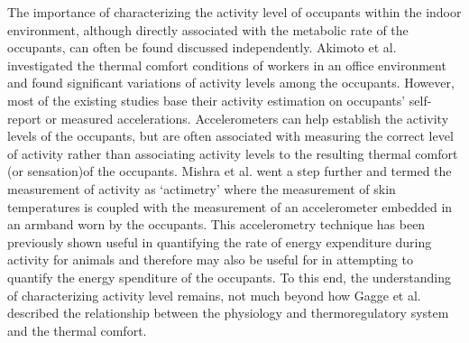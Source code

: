 	The importance of characterizing the activity level of occupants within the indoor environment, although directly associated with the metabolic rate of the occupants, can often be found discussed independently. Akimoto et al. investigated the thermal comfort conditions of workers in an office environment and found significant variations of activity levels among the occupants\cite{akimoto_thermal_2010}. However, most of the existing studies base their activity estimation on occupants' self-report \cite{huang_potential_2015} or measured accelerations. Accelerometers can help establish the activity levels of the occupants\cite{rothney_validity_2008}, but are often associated with measuring the correct level of activity rather than associating activity levels to the resulting thermal comfort (or sensation)of the occupants. Mishra et al. went a step further and termed the measurement of activity as `actimetry' where the measurement of skin temperatures is coupled with the measurement of an accelerometer embedded in an armband worn by the occupants\cite{mishra_actimetry_2019}. This accelerometry technique has been previously shown useful in quantifying the rate of energy expenditure during activity for animals \cite{wilson_moving_2006} and therefore may also be useful for in attempting to quantify the energy spenditure of the occupants. 
	To this end, the understanding of characterizing activity level remains, not much beyond how Gagge et al. described the relationship between the physiology and thermoregulatory system and the thermal comfort\cite{gagge_comfort_1967}. 

